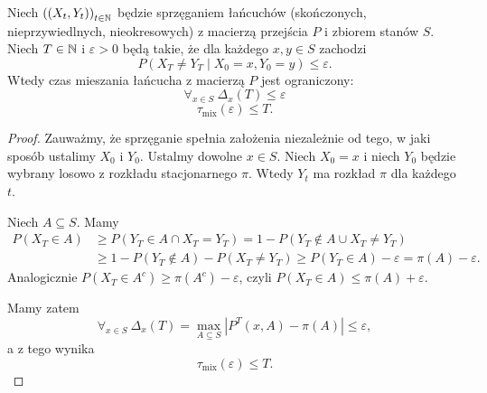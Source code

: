 \begin{lemma}
	Niech \(\left( \left( X_t,Y_t \right)  \right) _{t \in \mathbb{N}}\) będzie sprzęganiem łańcuchów (skończonych, nieprzywiedlnych, nieokresowych) z macierzą przejścia \(P\) i zbiorem stanów \(S\). Niech \(T \in \mathbb{N}\) i \(\varepsilon > 0\) będą takie, że dla każdego \(x,y \in S\) zachodzi
	\[ P\left( X_T \neq Y_T \mid X_0 = x, Y_0 = y  \right) \le \varepsilon. \]
	Wtedy czas mieszania łańcucha z macierzą \(P\) jest ograniczony:
	\[ \forall_{x \in S} \   \Delta_x\left( T \right) \le \varepsilon \]
	\[ \tau_{\mathrm{mix}}\left( \varepsilon  \right) \le T. \]
\end{lemma}
\begin{proof}
	Zauważmy, że sprzęganie spełnia założenia niezależnie od tego, w jaki sposób ustalimy \(X_0\) i \(Y_0\). Ustalmy dowolne \(x \in S\). Niech \(X_0 = x \) i niech \(Y_0\) będzie wybrany losowo z rozkładu stacjonarnego \(\pi\). Wtedy \(Y_t\) ma rozkład \(\pi\) dla każdego \(t\).

	Niech \(A \subseteq S\). Mamy
	\begin{align*}
		P\left( X_T \in A  \right) & \ge P\left( Y_T \in A \cap X_T = Y_T \right) = 1- P\left( Y_T \notin A \cup X_T \neq Y_T \right)                                                      \\
		                           & \ge 1-P\left( Y_T \notin A  \right) - P\left( X_T \neq Y_T \right) \ge P\left( Y_T \in A  \right) - \varepsilon = \pi\left( A  \right) - \varepsilon.
	\end{align*}
	Analogicznie \(P\left( X_T \in A^{c} \right) \ge \pi\left( A^{c} \right) - \varepsilon \), czyli \(P\left( X_T \in A  \right) \le \pi\left( A  \right) + \varepsilon \).

	Mamy zatem
	\[ \forall_{x \in S} \ \Delta_x\left( T \right) =  \max_{A \subseteq S} \left|P^{T}\left( x,A \right) - \pi\left( A  \right) \right|\le \varepsilon,\]
	a z tego wynika
	\[ \tau_{\mathrm{mix}}\left( \varepsilon  \right) \le T. \]
\end{proof}

